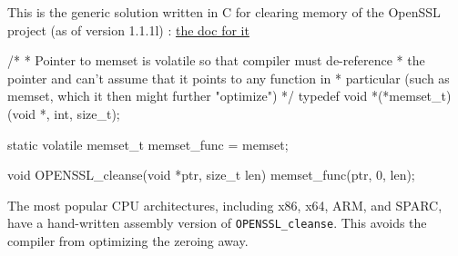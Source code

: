 



This is the generic solution written in C for clearing memory of the OpenSSL project (as of version 1.1.1l) : \href{https://www.openssl.org/docs/man1.1.1/man3/OPENSSL_cleanse.html}{the doc for it}
\begin{ccode}
/*
 * Pointer to memset is volatile so that compiler must de-reference
 * the pointer and can't assume that it points to any function in
 * particular (such as memset, which it then might further "optimize")
 */
typedef void *(*memset_t)(void *, int, size_t);

static volatile memset_t memset_func = memset;

void OPENSSL_cleanse(void *ptr, size_t len)
{
    memset_func(ptr, 0, len);
}
\end{ccode}
The most popular CPU architectures, including x86, x64, ARM, and SPARC, have a hand-written assembly version of \texttt{OPENSSL\_cleanse}. This avoids the compiler from optimizing the zeroing away.
